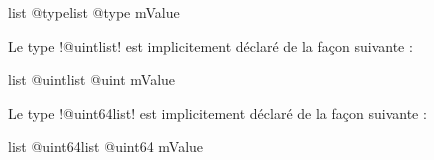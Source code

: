 \begin{galgas4box}
list @typelist {
  @type mValue
}
\end{galgas4box}






Le type \ggsq!@uintlist! est implicitement déclaré de la façon suivante :

\begin{galgas4box}
list @uintlist {
  @uint mValue
}
\end{galgas4box}







Le type \ggsq!@uint64list! est implicitement déclaré de la façon suivante :

\begin{galgas4box}
list @uint64list {
  @uint64 mValue
}
\end{galgas4box}

